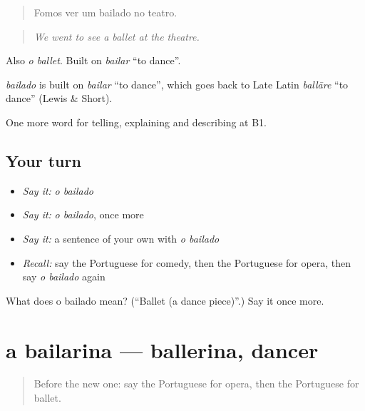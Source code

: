 \begin{quote}
Fomos ver um bailado no teatro.
\end{quote}

\begin{quote}
\emph{We went to see a ballet at the theatre.}
\end{quote}

Also \emph{o ballet}. Built on \emph{bailar} \textquotedblleft{}to dance\textquotedblright{}.

\begin{cousinweb}
\emph{bailado} is built on \emph{bailar} \textquotedblleft{}to dance\textquotedblright{}, which goes back to Late Latin \emph{ballāre} \textquotedblleft{}to dance\textquotedblright{} (Lewis \& Short).
\end{cousinweb}

\begin{grammarlens}[title={What you've built}]
One more word for telling, explaining and describing at B1.
\end{grammarlens}

\subsection*{Your turn}
\begin{itemize}
\raggedright
  \item \emph{Say it:} \emph{o bailado}
  \item \emph{Say it:} \emph{o bailado}, once more
  \item \emph{Say it:} a sentence of your own with \emph{o bailado}
  \item \emph{Recall:} say the Portuguese for comedy, then the Portuguese for opera, then say \emph{o bailado} again
\end{itemize}

\begin{tcolorbox}[breakable,colback=teal!4,colframe=teal!35!black,title={Before you move on}]
What does o bailado mean? (\textquotedblleft{}Ballet (a dance piece)\textquotedblright{}.) Say it once more.
\end{tcolorbox}
\section[a bailarina]{a bailarina — ballerina, dancer}

\label{lesson:PT-C521-bailarina}



\begin{quote}
Before the new one: say the Portuguese for opera, then the Portuguese for ballet.
\end{quote}

